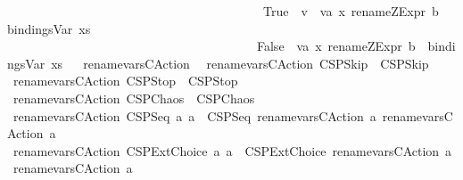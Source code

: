 \begin{isabellebody}
\ \ \ \ \ \ \ \ \ \ \ \ \ \ \ \ \ \ \ \ \ \ \ \ \ \ \ \ \ \ \ \ \ \ \ \ \ \ \ \ \ True\ {\isasymRightarrow}\ {\isacharbrackleft}{\isacharparenleft}{\isacharparenleft}{\isacharprime}{\isacharprime}v{\isacharunderscore}{\isacharprime}{\isacharprime}\ {\isacharat}\ va{\isacharcomma}\ x{\isacharparenright}{\isacharcomma}\ {\isacharparenleft}rename{\isacharunderscore}ZExpr\ b{\isacharparenright}{\isacharparenright}{\isacharbrackright}\ {\isacharat}\ {\isacharparenleft}bindingsVar\ xs{\isacharparenright}\isanewline
\ \ \ \ \ \ \ \ \ \ \ \ \ \ \ \ \ \ \ \ \ \ \ \ \ \ \ \ \ \ \ \ \ \ \ \ \ \ \ {\isacharbar}\ False\ {\isasymRightarrow}\ {\isacharbrackleft}{\isacharparenleft}{\isacharparenleft}va{\isacharcomma}\ x{\isacharparenright}{\isacharcomma}\ {\isacharparenleft}rename{\isacharunderscore}ZExpr\ b{\isacharparenright}{\isacharparenright}{\isacharbrackright}\ {\isacharat}\ {\isacharparenleft}bindingsVar\ xs{\isacharparenright}{\isacharparenright}{\isachardoublequoteclose}\isanewline
\isanewline
\ \isanewline
{}\isamarkupfalse%
\ rename{\isacharunderscore}vars{\isacharunderscore}CAction\isanewline
{}\isanewline
\ \ {\isachardoublequoteopen}rename{\isacharunderscore}vars{\isacharunderscore}CAction\ CSPSkip\ {\isacharequal}\ CSPSkip{\isachardoublequoteclose}\isanewline
{\isacharbar}\ {\isachardoublequoteopen}rename{\isacharunderscore}vars{\isacharunderscore}CAction\ CSPStop\ {\isacharequal}\ CSPStop{\isachardoublequoteclose}\isanewline
{\isacharbar}\ {\isachardoublequoteopen}rename{\isacharunderscore}vars{\isacharunderscore}CAction\ CSPChaos\ {\isacharequal}\ CSPChaos{\isachardoublequoteclose}\isanewline
{\isacharbar}\ {\isachardoublequoteopen}rename{\isacharunderscore}vars{\isacharunderscore}CAction\ {\isacharparenleft}CSPSeq\ a{}\ a{}{\isacharparenright}\ {\isacharequal}\ {\isacharparenleft}CSPSeq\ {\isacharparenleft}rename{\isacharunderscore}vars{\isacharunderscore}CAction\ a{}{\isacharparenright}\ {\isacharparenleft}rename{\isacharunderscore}vars{\isacharunderscore}CAction\ a{}{\isacharparenright}{\isacharparenright}{\isachardoublequoteclose}\isanewline
{\isacharbar}\ {\isachardoublequoteopen}rename{\isacharunderscore}vars{\isacharunderscore}CAction\ {\isacharparenleft}CSPExtChoice\ a{}\ a{}{\isacharparenright}\ {\isacharequal}\ {\isacharparenleft}CSPExtChoice\ {\isacharparenleft}rename{\isacharunderscore}vars{\isacharunderscore}CAction\ a{}{\isacharparenright}\ {\isacharparenleft}rename{\isacharunderscore}vars{\isacharunderscore}CAction\ a{}{\isacharparenright}{\isacharparenright}{\isachardoublequoteclose}\isanewline

\end{isabellebody}
